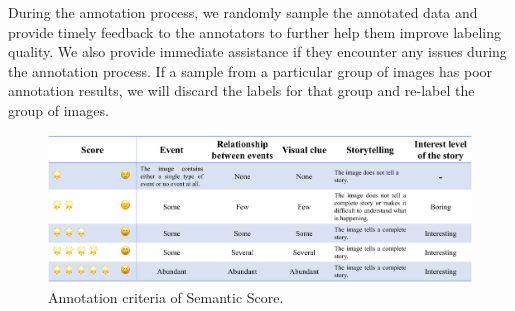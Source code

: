 During the annotation process, we randomly sample the annotated data and provide timely feedback to the annotators to further help them improve labeling quality.
We also provide immediate assistance if they encounter any issues during the annotation process.
If a sample from a particular group of images has poor annotation results, we will discard the labels for that group and re-label the group of images.




\begin{figure}[htbp]
    \centering
    \includegraphics[scale=0.55]{figs/semantic_ann2.pdf}
    \caption{Annotation criteria of Semantic Score.}
    \label{semantic_ann}
\end{figure}





